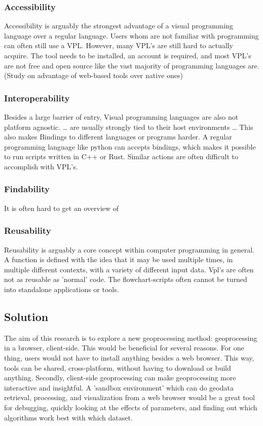 \subsubsection*{Accessibility}
Accessibility is arguably the strongest advantage of a visual programming language over a regular language. 
Users whom are not familiar with programming can often still use a VPL. 
However, many VPL's are still hard to actually acquire. 
The tool needs to be installed, an account is required, and most VPL's are not free and open source like the vast majority of programming languages are. (Study on advantage of web-based tools over native ones)

\subsubsection*{Interoperability}
Besides a large barrier of entry, Visual programming languages are also not platform agnostic. 
\dots
are usually strongly tied to their host environments
\dots
This also makes Bindings to different languages or programs harder. A regular programming language like python can accepts bindings, which makes it possible to run scripts written in C++ or Rust. Similar actions are often difficult to accomplish with VPL's.

\subsubsection*{Findability}
It is often hard to get an overview of 


\subsubsection*{Reusability}
Reusability is arguably a core concept within computer programming in general. 
A function is defined with the idea that it may be used multiple times, in multiple different contexts, with a variety of different input data.
Vpl's are often not as reusable as 'normal' code. The flowchart-scripts often cannot be turned into standalone applications or tools.



\newpage
\subsection{Solution}
The aim of this research is to explore a new geoprocessing method: geoprocessing in a browser, client-side. 
This would be beneficial for several reasons. 
For one thing, users would not have to install anything besides a web browser. This way, tools can be shared, cross-platform, without having to download or build anything. 
Secondly, client-side geoprocessing can make geoprocessing more interactive and insightful. A 'sandbox environment' which can do geodata retrieval, processing, and visualization from a web browser would be a great tool for debugging, quickly looking at the effects of parameters, and finding out which algorithms work best with which dataset.

